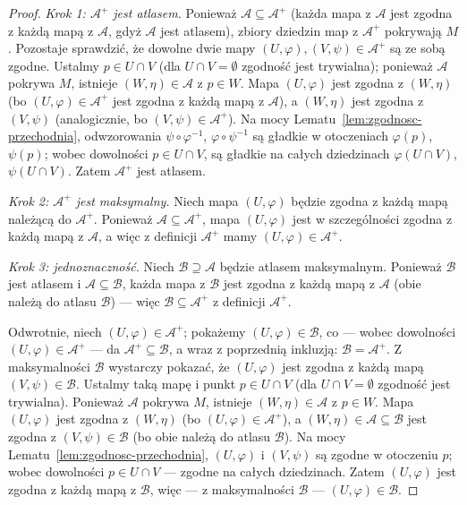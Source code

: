 \begin{proof}
\emph{Krok 1: $\mathcal{A}^+$ jest atlasem.} Ponieważ $\mathcal{A}\subseteq\mathcal{A}^+$
(każda mapa z $\mathcal{A}$ jest zgodna z każdą mapą z $\mathcal{A}$, gdyż $\mathcal{A}$
jest atlasem), zbiory dziedzin map z $\mathcal{A}^+$ pokrywają $M$. Pozostaje sprawdzić, że
dowolne dwie mapy $(U,\varphi),(V,\psi)\in\mathcal{A}^+$ są ze sobą zgodne. Ustalmy
$p\in U\cap V$ (dla $U\cap V=\emptyset$ zgodność jest trywialna); ponieważ $\mathcal{A}$
pokrywa $M$, istnieje $(W,\eta)\in\mathcal{A}$ z $p\in W$. Mapa $(U,\varphi)$ jest zgodna z
$(W,\eta)$ (bo $(U,\varphi)\in\mathcal{A}^+$ jest zgodna z każdą mapą z $\mathcal A$), a
$(W,\eta)$ jest zgodna z $(V,\psi)$ (analogicznie, bo $(V,\psi)\in\mathcal A^+$). Na mocy
Lematu~\ref{lem:zgodnosc-przechodnia}, odwzorowania $\psi\circ\varphi^{-1}$,
$\varphi\circ\psi^{-1}$ są gładkie w otoczeniach $\varphi(p)$, $\psi(p)$; wobec dowolności
$p\in U\cap V$, są gładkie na całych dziedzinach $\varphi(U\cap V)$, $\psi(U\cap V)$. Zatem
$\mathcal{A}^+$ jest atlasem.

\emph{Krok 2: $\mathcal{A}^+$ jest maksymalny.} Niech mapa $(U,\varphi)$ będzie zgodna z
każdą mapą należącą do $\mathcal{A}^+$. Ponieważ $\mathcal{A}\subseteq\mathcal{A}^+$, mapa
$(U,\varphi)$ jest w szczególności zgodna z każdą mapą z $\mathcal{A}$, a więc z definicji
$\mathcal{A}^+$ mamy $(U,\varphi)\in\mathcal{A}^+$.

\emph{Krok 3: jednoznaczność.} Niech $\mathcal B\supseteq\mathcal A$ będzie atlasem
maksymalnym. Ponieważ $\mathcal B$ jest atlasem i $\mathcal A\subseteq\mathcal B$, każda
mapa z $\mathcal B$ jest zgodna z każdą mapą z $\mathcal A$ (obie należą do atlasu
$\mathcal B$) — więc $\mathcal B\subseteq\mathcal A^+$ z definicji $\mathcal A^+$.

Odwrotnie, niech $(U,\varphi)\in\mathcal A^+$; pokażemy $(U,\varphi)\in\mathcal B$, co —
wobec dowolności $(U,\varphi)\in\mathcal A^+$ — da $\mathcal A^+\subseteq\mathcal B$, a
wraz z poprzednią inkluzją: $\mathcal B=\mathcal A^+$. Z maksymalności $\mathcal B$
wystarczy pokazać, że $(U,\varphi)$ jest zgodna z każdą mapą $(V,\psi)\in\mathcal B$.
Ustalmy taką mapę i punkt $p\in U\cap V$ (dla $U\cap V=\emptyset$ zgodność jest trywialna).
Ponieważ $\mathcal A$ pokrywa $M$, istnieje $(W,\eta)\in\mathcal A$ z $p\in W$. Mapa
$(U,\varphi)$ jest zgodna z $(W,\eta)$ (bo $(U,\varphi)\in\mathcal A^+$), a $(W,\eta)\in
\mathcal A\subseteq\mathcal B$ jest zgodna z $(V,\psi)\in\mathcal B$ (bo obie należą do
atlasu $\mathcal B$). Na mocy Lematu~\ref{lem:zgodnosc-przechodnia}, $(U,\varphi)$ i
$(V,\psi)$ są zgodne w otoczeniu $p$; wobec dowolności $p\in U\cap V$ — zgodne na całych
dziedzinach. Zatem $(U,\varphi)$ jest zgodna z każdą mapą z $\mathcal B$, więc — z
maksymalności $\mathcal B$ — $(U,\varphi)\in\mathcal B$.


\end{proof}
